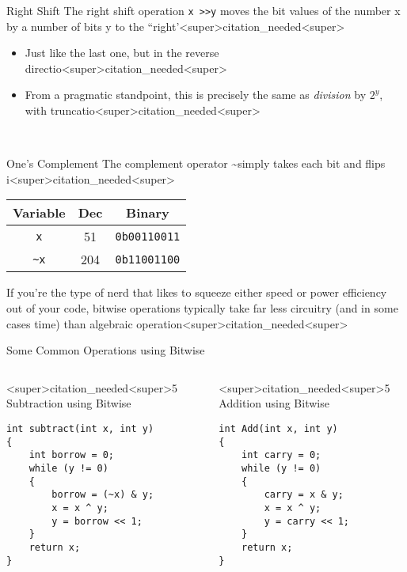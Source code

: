 \documentclass[11pt]{beamer}
\begin{document}
\begin{frame}{Right Shift}
The right shift operation \texttt{x \textgreater\textgreater y} moves the bit values of the number x by a number of bits y to the ``right'<super>citation_needed<super>  
\begin{itemize}
\item Just like the last one, but in the reverse directio<super>citation_needed<super>  
\item From a pragmatic standpoint, this is precisely the same as \emph{division} by $2^{y}$, with truncatio<super>citation_needed<super>
\end{itemize}
\center 
\
\end{frame}

\begin{frame}{One's Complement}
The complement operator \textasciitilde simply takes each bit and flips i<super>citation_needed<super>  
\center
\begin{tabular}{| c | c | c |}
\hline
Variable & Dec & Binary \\ \hline
\texttt{x} & 51 & \texttt{0b00110011} \\ \hline
\texttt{\textasciitilde x} & 204 & \texttt{0b11001100} \\ \hline
\end{tabular}
\flushleft
If you're the type of nerd that likes to squeeze either speed or power efficiency out of your code, bitwise operations typically take far less circuitry (and in some cases time) than algebraic operation<super>citation_needed<super>  
\end{frame}

\begin{frame}[fragile=singleslide]{Some Common Operations using Bitwise}
\begin{columns}
\begin{column}{<super>citation_needed<super>5\textwidth}
Subtraction using Bitwise
\begin{lstlisting}[style=C]
int subtract(int x, int y) 
{ 
	int borrow = 0;
    while (y != 0) 
    { 
        borrow = (~x) & y; 
        x = x ^ y; 
        y = borrow << 1; 
    } 
    return x; 
} 
\end{lstlisting}
\end{column}
\begin{column}{<super>citation_needed<super>5\textwidth}
Addition using Bitwise
\begin{lstlisting}[style=C]
int Add(int x, int y)  
{  
	int carry = 0;
    while (y != 0)  
    {  
        carry = x & y;  
        x = x ^ y;  
        y = carry << 1;  
    }  
    return x;  
}  
\end{lstlisting}
\end{column}
\end{columns}
\end{frame}
\end{document}
